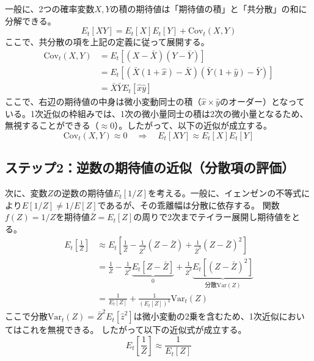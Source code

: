 一般に、2つの確率変数\(X,Y\)の積の期待値は「期待値の積」と「共分散」の和に分解できる。
\begin{equation}
    E_t[XY]=E_t[X]E_t[Y]+\text{Cov}_t(X,Y)
    \label{eq:appendix_exchange_rate_and_gdp_s1_covariance_decomposition}
\end{equation}
ここで、共分散の項を上記の定義に従って展開する。
\begin{align}
    \text{Cov}_t(X,Y)&=E_t\left[(X-\bar{X})(Y-\bar{Y})\right] \nonumber \\
    &=E_t\left[\left(\bar{X}(1+\hat{x})-\bar{X}\right)\left(\bar{Y}(1+\hat{y})-\bar{Y}\right)\right] \nonumber \\
    &=\bar{X}\bar{Y}E_t\left[\hat{x}\hat{y}\right]
    \label{eq:appendix_exchange_rate_and_gdp_s1_covariance_order}
\end{align}
ここで、右辺の期待値の中身は微小変動同士の積（\(\hat{x}\times\hat{y}\)のオーダー）となっている。1次近似の枠組みでは、1次の微小量同士の積は2次の微小量となるため、無視することができる（\(\approx0\)）。したがって、以下の近似が成立する。
\begin{equation}
    \text{Cov}_t(X,Y)\approx0\quad\Longrightarrow\quad E_t[XY]\approx E_t[X]E_t[Y]
    \label{eq:appendix_exchange_rate_and_gdp_s1_approx_product}
\end{equation}

\subsection*{ステップ2：逆数の期待値の近似（分散項の評価）}
\label{sec:appendix_exchange_rate_and_gdp_s1_sub2}

次に、変数\(Z\)の逆数の期待値\(E_t[1/Z]\)を考える。一般に、イェンゼンの不等式により\(E[1/Z]\neq1/E[Z]\)であるが、その乖離幅は分散に依存する。
関数\(f(Z)=1/Z\)を期待値\(\bar{Z}=E_t[Z]\)の周りで2次までテイラー展開し期待値をとる。
\begin{align}
    E_t\left[\frac{1}{Z}\right]&\approx E_t\left[\frac{1}{\bar{Z}}-\frac{1}{\bar{Z}^2}(Z-\bar{Z})+\frac{1}{\bar{Z}^3}(Z-\bar{Z})^2\right] \nonumber \\
    &=\frac{1}{\bar{Z}}-\frac{1}{\bar{Z}^2}\underbrace{E_t[Z-\bar{Z}]}_{0}+\frac{1}{\bar{Z}^3}\underbrace{E_t[(Z-\bar{Z})^2]}_{\text{分散Var}(Z)} \nonumber \\
    &=\frac{1}{E_t[Z]}+\frac{1}{(E_t[Z])^3}\text{Var}_t(Z)
    \label{eq:appendix_exchange_rate_and_gdp_s1_jensen_approx}
\end{align}
ここで分散\(\text{Var}_t(Z)=\bar{Z}^2E_t\left[\hat{z}^2\right]\)は微小変動の2乗を含むため、1次近似においてはこれを無視できる。
したがって以下の近似式が成立する。
\begin{equation}
    E_t\left[\frac{1}{Z}\right]\approx\frac{1}{E_t[Z]}
    \label{eq:appendix_exchange_rate_and_gdp_s1_approx_inverse}
\end{equation}

